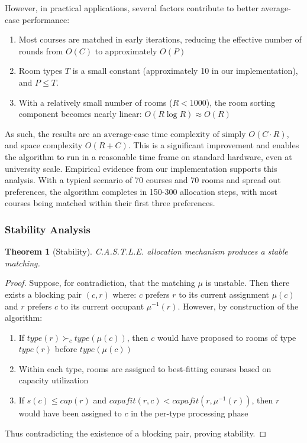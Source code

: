 \documentclass[a4paper, oneside]{article}
\theoremstyle{plain}
\newtheorem{theorem}{Theorem}
\newcommand{\castle}{C{\small.}A{\small.}S{\small.}T{\small.}L{\small.}E{\small.}}
\begin{document}
However, in practical applications, several factors contribute to better average-case performance:
\begin{enumerate}
	\item Most courses are matched in early iterations, reducing the effective number of rounds from $O(C)$ to approximately $O(P)$
	\item Room types $T$ is a small constant (approximately 10 in our implementation), and $P \leq T$.
	\item With a relatively small number of rooms ($R < 1000$), the room sorting component becomes nearly linear: $O(R \log R) \approx O(R)$
\end{enumerate}

As such, the results are an $\boxed{\text{average-case time complexity of simply } O(C \cdot R)}$, and space complexity $O(R + C)$. This is a significant improvement and
enables the algorithm to run in a reasonable time frame on standard hardware, even at university scale.
Empirical evidence from our implementation supports this analysis. With a typical scenario of 70 courses and 70 rooms and spread out preferences, the algorithm completes in 150-300 allocation steps,
with most courses being matched within their first three preferences.

\subsubsection{Stability Analysis}
\begin{theorem}[Stability]
	\castle{} allocation mechanism produces a stable matching.
\end{theorem}

\begin{proof}
	Suppose, for contradiction, that the matching $\mu$ is unstable. Then there exists a blocking pair $(c, r)$ where:
	$c$ prefers $r$ to its current assignment $\mu(c)$ and $r$ prefers $c$ to its current occupant $\mu^{-1}(r)$.
	However, by construction of the algorithm:
	\begin{enumerate}
		\item If $type(r) \succ_c type(\mu(c))$, then $c$ would have proposed to rooms of type $type(r)$ before $type(\mu(c))$
		\item Within each type, rooms are assigned to best-fitting courses based on capacity utilization
		\item If $s(c) \leq cap(r)$ and $capafit(r,c) < capafit(r,\mu^{-1}(r))$, then $r$ would have been assigned to $c$ in the per-type processing phase
	\end{enumerate}
	Thus contradicting the existence of a blocking pair, proving stability.
\end{proof}
\end{document}
